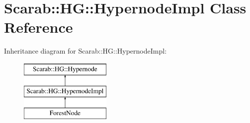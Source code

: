 \hypertarget{classScarab_1_1HG_1_1HypernodeImpl}{
\section{Scarab::HG::HypernodeImpl Class Reference}
\label{classScarab_1_1HG_1_1HypernodeImpl}
}
Inheritance diagram for Scarab::HG::HypernodeImpl:\begin{figure}[H]
\begin{center}
\leavevmode
\includegraphics[height=3cm]{classScarab_1_1HG_1_1HypernodeImpl}
\end{center}
\end{figure}
